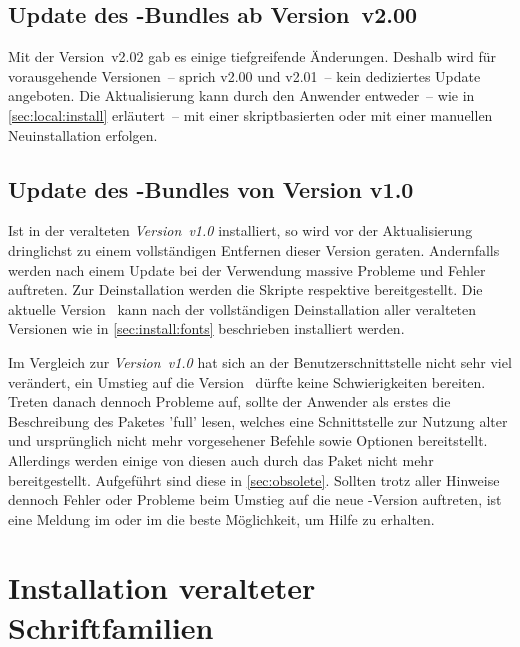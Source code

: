 \subsection{Update des \TUDScript-Bundles ab Version~v2.00}
%
Mit der Version~v2.02 gab es einige tiefgreifende Änderungen. Deshalb wird für 
vorausgehende Versionen~-- sprich v2.00 und v2.01~-- kein dediziertes Update 
angeboten. Die Aktualisierung kann durch den Anwender entweder~-- wie in 
\autoref{sec:local:install} erläutert~-- mit einer skriptbasierten oder mit 
einer manuellen Neuinstallation erfolgen.
%


\subsection{Update des \TUDScript-Bundles von Version v1.0}
%
Ist \TUDScript in der veralteten \emph{Version~v1.0} installiert, so wird vor 
der Aktualisierung dringlichst zu einem vollständigen Entfernen dieser Version 
geraten. Andernfalls werden nach einem Update bei der Verwendung massive 
Probleme und Fehler auftreten. Zur Deinstallation werden die Skripte 
respektive
bereitgestellt. Die aktuelle Version~\vTUDScript{} kann nach der vollständigen 
Deinstallation aller veralteten Versionen wie in \autoref{sec:install:fonts} 
beschrieben installiert werden.

Im Vergleich zur \emph{Version~v1.0} hat sich an der Benutzerschnittstelle 
nicht sehr viel verändert, ein Umstieg auf die Version~\vTUDScript{} dürfte 
keine Schwierigkeiten bereiten. Treten danach dennoch Probleme auf, sollte der 
Anwender als erstes die Beschreibung des Paketes 'full' 
lesen, welches eine Schnittstelle zur Nutzung alter und ursprünglich nicht mehr 
vorgesehener Befehle sowie Optionen bereitstellt. Allerdings werden einige von 
diesen auch durch das Paket  nicht mehr bereitgestellt. 
Aufgeführt sind diese in \autoref{sec:obsolete}. Sollten trotz aller Hinweise 
dennoch Fehler oder Probleme beim Umstieg auf die neue \TUDScript-Version 
auftreten, ist eine Meldung im \Forum oder im \GitHubRepo[issues] die beste 
Möglichkeit, um Hilfe zu erhalten.



\section{Installation veralteter Schriftfamilien}
%
%

